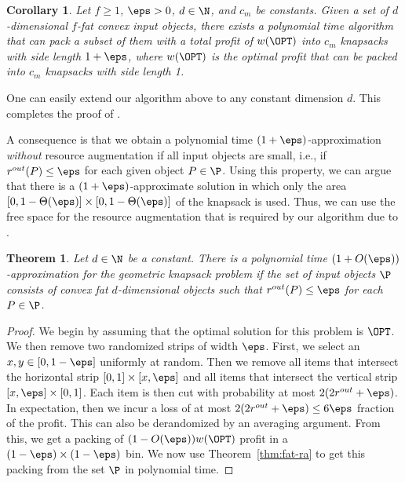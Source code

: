 \documentclass[10pt,a4paper]{article}
\newtheorem{theorem}{Theorem}[section]
\newtheorem{corollary}{Corollary}[section]
\theoremstyle{plain}
\theoremstyle{plain}
\theoremstyle{plain}
\theoremstyle{definition}
\newcommand{\ari}[1]{#1}
\newcommand{\ag}[1]{#1}
\begin{document}
{\begin{corollary}
	\label{cor:fat-ra}
	Let \ari{$f\ge 1$}, $\eps>0$, $d\in \N$, and $c_m$ be constants. Given a set of $d$-dimensional $f$-fat convex input objects, there exists a polynomial time algorithm that can pack a subset of them with a total profit of \ag{$w(\OPT)$} into $c_m$ knapsacks with side length $1+\eps$, where \ag{$w(\OPT)$} is the optimal profit that can be packed into $c_m$ knapsacks with side length 1.
\end{corollary}

One can easily extend our algorithm above to any constant dimension $d$.
This completes the proof of . %


A consequence is that we obtain a polynomial time $(1+\eps)$-approximation
\emph{without }resource augmentation if all input objects are small,
i.e., if $r^{out}(P)\le\eps$ for each given object $P\in\P$.
Using this property, we can argue that there is a $(1+\eps)$-approximate solution
in which only the area $[0, 1-\Theta(\eps)]\times[0, 1-\Theta(\eps)]$ of the
knapsack is used. Thus, we can use the free space for the resource augmentation
that is required by our algorithm due to .


\begin{theorem}
\label{lem:small-poly}
Let $d\in \N$ be a constant.
There is a polynomial time $(1+O(\eps))$-approximation
for the geometric knapsack problem if the set of input objects $\P$
consists of convex fat $d$-dimensional objects such that $r^{out}(P)\le\eps$
for each $P\in\P$.
\end{theorem}

\begin{proof}
We begin by assuming that the optimal solution for this problem is $\OPT$. We then remove two randomized strips of width $\eps$.
First, we select an $x,y \in [0,1-\eps]$ uniformly at random. Then we remove all items that intersect the horizontal strip $[0,1]\times [x, \eps]$ and all items that intersect the vertical strip $[x, \eps] \times [0,1]$. 
Each item is then cut with probability at most $2(2 r^{out}+\eps)$. 
In expectation, then we incur a loss of at most $2(2 r^{out}+\eps) \le 6 \eps$ fraction of the profit. 
This can also be derandomized by an averaging argument. 
From this, we get a packing of $(1-O(\eps)) \ag{w(\OPT)}$ profit in a $(1-\eps)\times (1-\eps)$ bin. We now use Theorem~\ref{thm:fat-ra} to get this packing from the set $\P$ in polynomial time. 
\end{proof}

}
\end{document}
